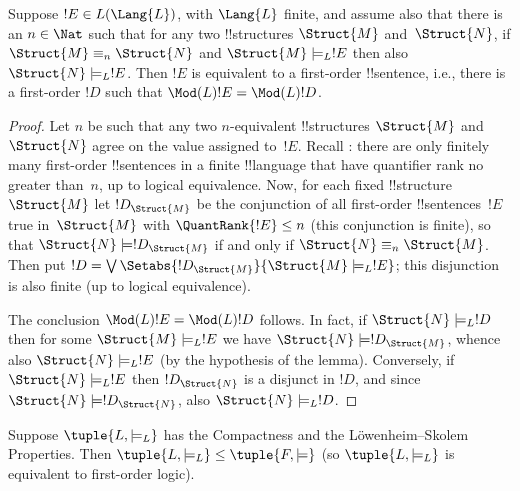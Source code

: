 \documentclass[../../../include/open-logic-section]{subfiles}
\begin{document}


\begin{lem}
Suppose $!E \in L(\Lang{L})$, with $\Lang{L}$ finite, and assume
also that there is an $n \in \Nat$ such that for any two
!!{structure}s $\Struct{M}$ and~$\Struct{N}$, if $\Struct{M} \equiv_n
\Struct{N}$ and $\Struct{M} \models_L !E$ then also $\Struct{N}
\models_L !E$. Then $!E$ is equivalent to a first-order
!!{sentence}, i.e., there is a first-order $!D$ such that
$\Mod(L){!E} = \Mod(L){!D}$.
\end{lem}

\begin{proof} 
Let $n$ be such that any two $n$-equivalent !!{structure}s
$\Struct{M}$ and $\Struct{N}$ agree on the value assigned to~$!E$.
Recall : there are only finitely many
first-order !!{sentence}s in a finite !!{language} that have
quantifier rank no greater than~$n$, up to logical equivalence. Now,
for each fixed !!{structure}~$\Struct{M}$ let $!D_{\Struct{M}}$ be the
conjunction of all first-order !!{sentence}s~$!E$ true in~$\Struct{M}$
with $\QuantRank{!E} \le n$ (this conjunction is finite), so that
$\Struct{N} \models !D_{\Struct{M}}$ if and only if $\Struct{N}
\equiv_n \Struct{M}$. Then put $!D = \textstyle\bigvee
\Setabs{!D_{\Struct{M}}}{\Struct{M} \models_L !E}$; this disjunction
is also finite (up to logical equivalence).

The conclusion $\Mod(L){!E} = \Mod(L){!D}$ follows. In fact, if
$\Struct{N} \models_L !D$ then for some $\Struct{M} \models_L
!E$ we have $\Struct{N} \models !D_{\Struct{M}}$, whence also
$\Struct{N} \models_L !E$ (by the hypothesis of the
lemma). Conversely, if $\Struct{N} \models_L !E$ then
$!D_\Struct{N}$ is a disjunct in $!D$, and since $\Struct{N}
\models !D_\Struct{N}$, also $\Struct{N} \models_L !D$.
\end{proof}

\begin{thm}
   Suppose $\tuple{L, \models_L}$ has the
  Compactness and the L\"owenheim--Skolem Properties. Then
  $\tuple{L, \models_L} \le \tuple{F, \models}$ (so
  $\tuple{L, \models_L}$ is equivalent to first-order logic).
\end{thm}
\end{document}

